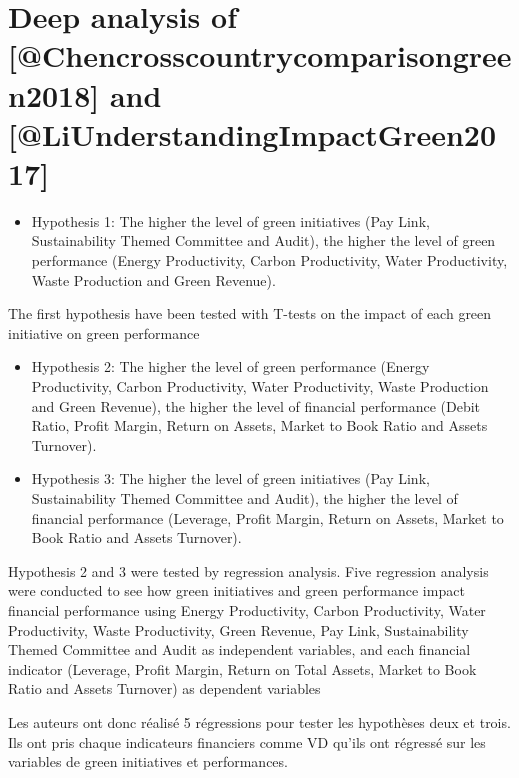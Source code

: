 \documentclass[]{article}
\providecommand{\tightlist}{%
  \setlength{\itemsep}{0pt}\setlength{\parskip}{0pt}}
\begin{document}
\section{Deep analysis of {[}@Chencrosscountrycomparisongreen2018{]} and
{[}@LiUnderstandingImpactGreen2017{]}}\label{deep-analysis-of-chencrosscountrycomparisongreen2018-and-liunderstandingimpactgreen2017}

\begin{itemize}
\tightlist
\item
  Hypothesis 1: The higher the level of green initiatives (Pay Link,
  Sustainability Themed Committee and Audit), the higher the level of
  green performance (Energy Productivity, Carbon Productivity, Water
  Productivity, Waste Production and Green Revenue).
\end{itemize}

The first hypothesis have been tested with T-tests on the impact of each
green initiative on green performance

\begin{itemize}
\item
  Hypothesis 2: The higher the level of green performance (Energy
  Productivity, Carbon Productivity, Water Productivity, Waste
  Production and Green Revenue), the higher the level of financial
  performance (Debit Ratio, Profit Margin, Return on Assets, Market to
  Book Ratio and Assets Turnover).
\item
  Hypothesis 3: The higher the level of green initiatives (Pay Link,
  Sustainability Themed Committee and Audit), the higher the level of
  financial performance (Leverage, Profit Margin, Return on Assets,
  Market to Book Ratio and Assets Turnover).
\end{itemize}

Hypothesis 2 and 3 were tested by regression analysis. Five regression
analysis were conducted to see how green initiatives and green
performance impact financial performance using Energy Productivity,
Carbon Productivity, Water Productivity, Waste Productivity, Green
Revenue, Pay Link, Sustainability Themed Committee and Audit as
independent variables, and each financial indicator (Leverage, Profit
Margin, Return on Total Assets, Market to Book Ratio and Assets
Turnover) as dependent variables

Les auteurs ont donc réalisé 5 régressions pour tester les hypothèses
deux et trois. Ils ont pris chaque indicateurs financiers comme VD
qu'ils ont régressé sur les variables de green initiatives et
performances.
\end{document}
